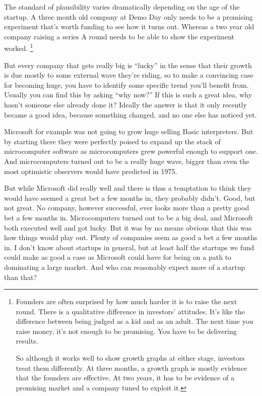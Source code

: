 The standard of plausibility varies dramatically depending on the age of
the startup. A three month old company at Demo Day only needs to be a
promising experiment that's worth funding to see how it turns out.
Whereas a two year old company raising a series A round needs to be able
to show the experiment worked. \footnote{Founders are often surprised by how much harder it is to raise
the next round. There is a qualitative difference in investors'
attitudes. It's like the difference between being judged as a kid and as
an adult. The next time you raise money, it's not enough to be
promising. You have to be delivering results.

So although it works well to show growth graphs at either stage,
investors treat them differently. At three months, a growth graph is
mostly evidence that the founders are effective. At two years, it has to
be evidence of a promising market and a company tuned to exploit it.}

But every company that gets really big is ``lucky'' in the sense that
their growth is due mostly to some external wave they're riding, so to
make a convincing case for becoming huge, you have to identify some
specific trend you'll benefit from. Usually you can find this by asking
``why now?'' If this is such a great idea, why hasn't someone else
already done it? Ideally the answer is that it only recently became a
good idea, because something changed, and no one else has noticed yet.

Microsoft for example was not going to grow huge selling Basic
interpreters. But by starting there they were perfectly poised to expand
up the stack of microcomputer software as microcomputers grew powerful
enough to support one. And microcomputers turned out to be a really huge
wave, bigger than even the most optimistic observers would have
predicted in 1975.

But while Microsoft did really well and there is thus a temptation to
think they would have seemed a great bet a few months in, they probably
didn't. Good, but not great. No company, however successful, ever looks
more than a pretty good bet a few months in. Microcomputers turned out
to be a big deal, and Microsoft both executed well and got lucky. But it
was by no means obvious that this was how things would play out. Plenty
of companies seem as good a bet a few months in. I don't know about
startups in general, but at least half the startups we fund could make
as good a case as Microsoft could have for being on a path to dominating
a large market. And who can reasonably expect more of a startup than
that?

